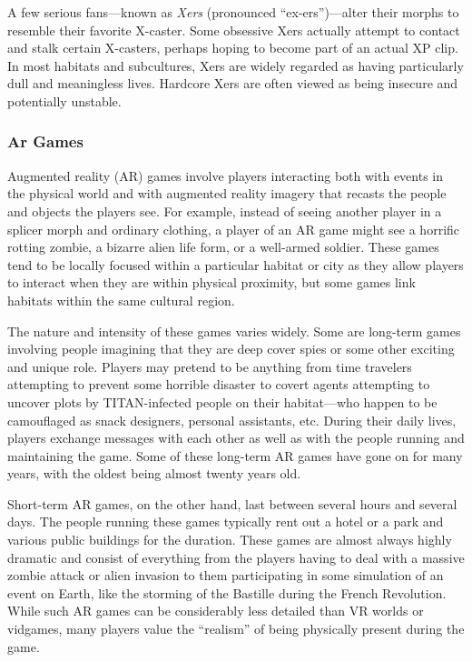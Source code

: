 A few serious fans—known as \textit{Xers} (pronounced 
``ex-ers'')—alter their morphs to resemble their favorite X-caster. Some obsessive Xers actually attempt to 
contact and stalk certain X-casters, perhaps hoping 
to become part of an actual XP clip. In most habitats 
and subcultures, Xers are widely regarded as having 
particularly dull and meaningless lives. Hardcore 
Xers are often viewed as being insecure and potentially unstable.

\subsubsection{Ar Games}

Augmented reality (AR) games involve players 
interacting both with events in the physical world 
and with augmented reality imagery that recasts the 
people and objects the players see. For example, instead of seeing another player in a splicer morph and 
ordinary clothing, a player of an AR game might see 
a horrific rotting zombie, a bizarre alien life form, or 
a well-armed soldier. These games tend to be locally 
focused within a particular habitat or city as they 
allow players to interact when they are within physical proximity, but some games link habitats within 
the same cultural region.

The nature and intensity of these games varies 
widely. Some are long-term games involving people 
imagining that they are deep cover spies or some other 
exciting and unique role. Players may pretend to be 
anything from time travelers attempting to prevent 
some horrible disaster to covert agents attempting 
to uncover plots by TITAN-infected people on their 
habitat—who happen to be camouflaged as snack 
designers, personal assistants, etc. During their daily 
lives, players exchange messages with each other as 
well as with the people running and maintaining 
the game. Some of these long-term AR games have 
gone on for many years, with the oldest being almost 
twenty years old.

Short-term AR games, on the other hand, last between several hours and several days. The people running these games typically rent out a hotel or a park 
and various public buildings for the duration. These 
games are almost always highly dramatic and consist 
of everything from the players having to deal with 
a massive zombie attack or alien invasion to them 
participating in some simulation of an event on Earth, 
like the storming of the Bastille during the French 
Revolution. While such AR games can be considerably less detailed than VR worlds or vidgames, many 
players value the ``realism'' of being physically present 
during the game.

